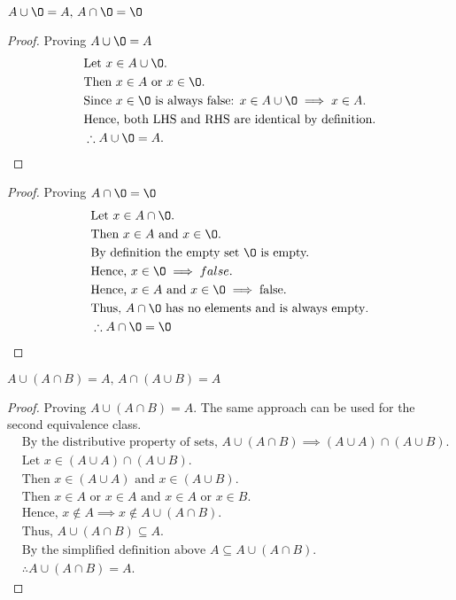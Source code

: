 \begin{question}
  $ A \cup \O = A \text{, } A \cap \O = \O $
\end{question}
\begin{proof}
  Proving $ A \cup \O = A$
  \begin{align*}
    & \text{Let } x \in A \cup \O. \\
    & \text{Then } x \in A \text{ or } x \in \O. \\
    & \text{Since } x \in \O \text{ is always false: }  x \in A \cup \O \implies x \in A. \\
    & \text{Hence, both LHS and RHS are identical by definition.} \\
    & \therefore A \cup \O = A.
  \end{align*}
\end{proof}
\begin{proof}
  Proving $A \cap \O = \O $
  \begin{align*}
    & \text{Let } x \in A \cap \O. \\
    & \text{Then } x \in A \text{ and } x \in \O. \\
    & \text{By definition the empty set } \O \text{ is empty.} \\
    & \text{Hence, } x \in \O \implies false. \\
    & \text{Hence, } x \in A \text{ and } x \in \O \implies \text{false}. \\
    & \text{Thus, } A \cap \O \text{ has no elements and is always empty}. \\
    & \therefore A \cap \O = \O
  \end{align*}
\end{proof}

\begin{question}
  $ A \cup (A \cap B) = A \text{, } A \cap (A \cup B) = A$
\end{question}
\begin{proof}
  Proving $A \cup (A \cap B) = A$. The same approach can be used for the second equivalence class.
  \begin{align*}
    & \text{By the distributive property of sets, } A \cup (A \cap B) \implies (A \cup A) \cap (A \cup B). \\
    & \text{Let } x \in (A \cup A) \cap (A \cup B). \\
    & \text{Then } x \in (A \cup A) \text{ and } x \in (A \cup B). \\
    & \text{Then } x \in A \text{ or } x \in A \text{ and } x \in A \text{ or } x \in B. \\
    & \text{Hence, } x \not \in A \implies x \not \in A \cup (A \cap B). \\
    & \text{Thus, } A \cup (A \cap B) \subseteq A. \\
    & \text{By the simplified definition above } A \subseteq A \cup (A \cap B). \\
    & \therefore A \cup (A \cap B) = A.
  \end{align*}
\end{proof}

